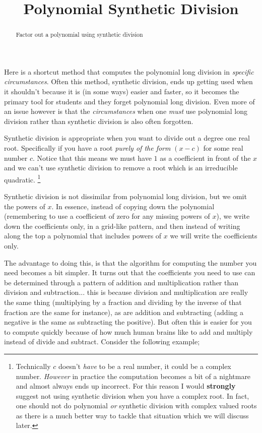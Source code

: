 \documentclass{ximeraXloud}
\title{Polynomial Synthetic Division}
\begin{document}
\begin{abstract}
    Factor out a polynomial using synthetic division
\end{abstract}%
\maketitle

Here is a shortcut method that computes the polynomial long division in \textit{specific circumstances}. Often this method, synthetic division, ends up getting used when it shouldn't because it is (in some ways) easier and faster, so it becomes the primary tool for students and they forget polynomial long division. Even more of an issue however is that the \textit{circumstances} when one \textit{must} use polynomial long division rather than synthetic division is also often forgotten.

Synthetic division is appropriate when you want to divide out a degree one real root. Specifically if you have a root \textit{purely of the form }$(x-c)$ for some real number $c$. Notice that this means we must have $1$ as a coefficient in front of the $x$ and we can't use synthetic division to remove a root which is an irreducible quadratic.%
\footnote{%
    Technically $c$ doesn't \textit{have} to be a real number, it could be a complex number. \textit{However} in practice the computation becomes a bit of a nightmare and almost always ends up incorrect. For this reason I would \textbf{strongly} suggest not using synthetic division when you have a complex root. In fact, one should not do polynomial \textit{or} synthetic division with complex valued roots as there is a much better way to tackle that situation which we will discuss later.%
    }

Synthetic division is not dissimilar from polynomial long division, but we omit the powers of $x$. In essence, instead of copying down the polynomial (remembering to use a coefficient of zero for any missing powers of $x$), we write down the coefficients only, in a grid-like pattern, and then instead of writing along the top a polynomial that includes powers of $x$ we will write the coefficients only.

The advantage to doing this, is that the algorithm for computing the number you need becomes a bit simpler. It turns out that the coefficients you need to use can be determined through a pattern of addition and multiplication rather than division and subtraction... this is because division and multiplication are really the same thing (multiplying by a fraction and dividing by the inverse of that fraction are the same for instance), as are addition and subtracting (adding a negative is the same as subtracting the positive). But often this is easier for you to compute quickly because of how much human brains like to add and multiply instead of divide and subtract. Consider the following example;
\end{document}
